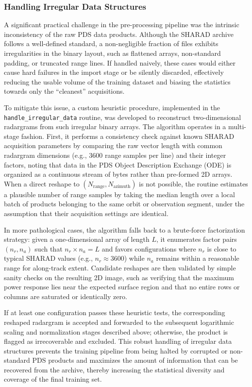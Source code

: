 \subsubsection{Handling Irregular Data Structures}
A significant practical challenge in the pre-processing pipeline was the intrinsic inconsistency of the raw PDS data products.
Although the SHARAD archive follows a well-defined standard, a non-negligible fraction of files exhibits irregularities in the binary layout, such as flattened arrays, non-standard padding, or truncated range lines.
If handled naively, these cases would either cause hard failures in the import stage or be silently discarded, effectively reducing the usable volume of the training dataset and biasing the statistics towards only the \enquote{cleanest} acquisitions.

To mitigate this issue, a custom heuristic procedure, implemented in the \texttt{handle\_irregular\_data} routine, was developed to reconstruct two-dimensional radargrams from such irregular binary arrays.
The algorithm operates in a multi-stage fashion.
First, it performs a consistency check against known SHARAD acquisition parameters by comparing the raw vector length with common radargram dimensions (e.g., $3600$ range samples per line) and their integer factors, noting that data in the PDS Object Description Exchange (ODE) is organized as a continuous stream of bytes rather than pre-formed 2D arrays.
When a direct reshape to $(N_{\text{range}}, N_{\text{azimuth}})$ is not possible, the routine estimates a plausible number of range samples by taking the median length over a local batch of products belonging to the same orbit or observation segment, under the assumption that their acquisition settings are identical.

In more pathological cases, the algorithm falls back to a brute-force factorization strategy: given a one-dimensional array of length $L$, it enumerates factor pairs $(n_r, n_a)$ such that $n_r \times n_a = L$ and favors configurations where $n_r$ is close to typical SHARAD values (e.g., $n_r \approx 3600$) while $n_a$ remains within a reasonable range for along-track extent.
Candidate reshapes are then validated by simple sanity checks on the resulting 2D image, such as verifying that the maximum power response lies near the expected surface region and that no entire rows or columns are saturated or identically zero.

If at least one configuration passes these heuristic tests, the corresponding reshaped radargram is accepted and forwarded to the subsequent logarithmic scaling and normalization stages described above; otherwise, the product is flagged as irrecoverable and excluded.
This robust handling of irregular data structures prevents the training pipeline from being halted by corrupted or non-standard PDS products and maximizes the amount of information that can be recovered from the archive, thereby increasing the statistical diversity and coverage of the final training set.

